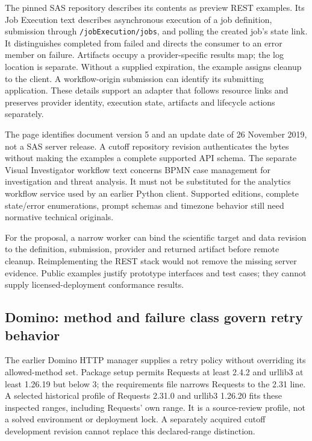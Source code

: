 The pinned SAS repository describes its contents as preview REST examples.
Its Job Execution text describes asynchronous execution of a job definition,
submission through \texttt{/jobExecution/jobs}, and polling the created
job's state link. It distinguishes completed from failed and directs the
consumer to an error member on failure. Artifacts occupy a provider-specific
results map; the log location is separate. Without a supplied expiration,
the example assigns cleanup to the client. A workflow-origin submission
can identify its submitting application. These details support an adapter
that follows resource links and preserves provider identity, execution
state, artifacts and lifecycle actions separately.
\citep{exec24_workflow_contracts_sas}

The page identifies document version 5 and an update date of 26 November
2019, not a SAS server release. A cutoff repository revision authenticates
the bytes without making the examples a complete supported API schema.
The separate Visual Investigator workflow text concerns BPMN case management
for investigation and threat analysis. It must not be substituted for the
analytics workflow service used by an earlier Python client. Supported
editions, complete state/error enumerations, prompt schemas and timezone
behavior still need normative technical originals.
\citep{exec24_workflow_contracts_sas}

For the proposal, a narrow worker can bind the scientific target and data
revision to the definition, submission, provider and returned artifact
before remote cleanup. Reimplementing the REST stack would not remove
the missing server evidence. Public examples justify prototype interfaces
and test cases; they cannot supply licensed-deployment conformance results.

\subsection{Domino: method and failure class govern retry behavior}

The earlier Domino HTTP manager supplies a retry policy without overriding
its allowed-method set. Package setup permits Requests at least 2.4.2 and
urllib3 at least 1.26.19 but below 3; the requirements file narrows Requests
to the 2.31 line. A selected historical profile of Requests 2.31.0 and
urllib3 1.26.20 fits these inspected ranges, including Requests' own range.
It is a source-review profile, not a solved environment or deployment lock.
A separately acquired cutoff development revision cannot replace this
declared-range distinction.\citep{exec24_workflow_contracts_domino}

